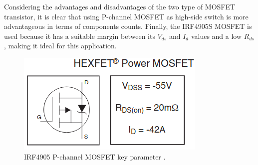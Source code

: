\documentclass[main.tex]{subfiles}
\begin{document}
    \justify
    Considering the advantages and disadvantages of the two type of MOSFET transistor, it is clear that using P-channel MOSFET as high-side switch is more advantageous in terms of components counts. Finally, the IRF4905S MOSFET is used because it has a suitable margin between its $V_{ds}$ and $I_{d}$ values and a low $R_{ds}$, making it ideal for this application. 

    \begin{figure}[!h]
        \centerline{\includegraphics[scale=0.5]{media/IRF4905_key_parameters.png}}
        \caption{IRF4905 P-channel MOSFET key parameter \cite{IRF4905S}.}
        \label{fig:IRF4905S_param}
    \end{figure}    
    
\end{document}
